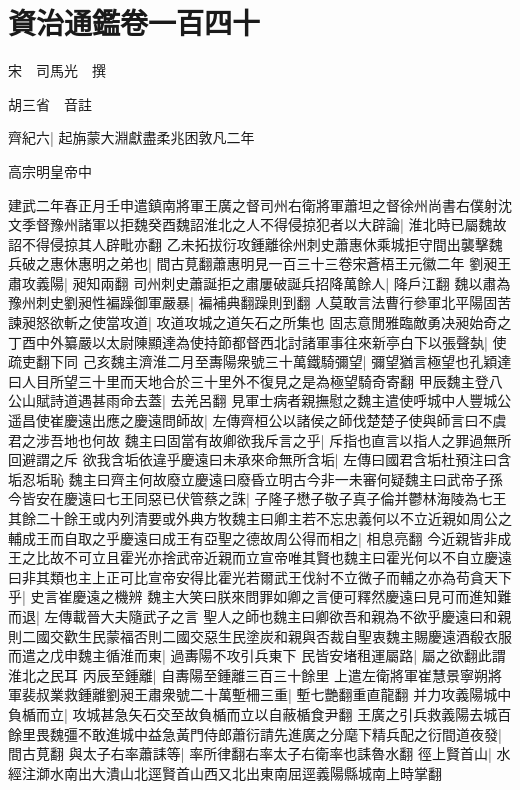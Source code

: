 \section{資治通鑑卷一百四十}
宋　司馬光　撰

胡三省　音註

齊紀六|{
	起旃蒙大淵獻盡柔兆困敦凡二年}


高宗明皇帝中

建武二年春正月壬申遣鎮南將軍王廣之督司州右衛將軍蕭坦之督徐州尚書右僕射沈文季督豫州諸軍以拒魏癸酉魏詔淮北之人不得侵掠犯者以大辟論|{
	淮北時已屬魏故詔不得侵掠其人辟毗亦翻}
乙未拓拔衍攻鍾離徐州刺史蕭惠休乘城拒守間出襲擊魏兵破之惠休惠明之弟也|{
	間古莧翻蕭惠明見一百三十三卷宋蒼梧王元徽二年}
劉昶王肅攻義陽|{
	昶知兩翻}
司州刺史蕭誕拒之肅屢破誕兵招降萬餘人|{
	降戶江翻}
魏以肅為豫州刺史劉昶性褊躁御軍嚴暴|{
	褊補典翻躁則到翻}
人莫敢言法曹行參軍北平陽固苦諫昶怒欲斬之使當攻道|{
	攻道攻城之道矢石之所集也}
固志意閒雅臨敵勇决昶始奇之丁酉中外纂嚴以太尉陳顯達為使持節都督西北討諸軍事往來新亭白下以張聲埶|{
	使疏吏翻下同}
己亥魏主濟淮二月至夀陽衆號三十萬鐵騎彌望|{
	彌望猶言極望也孔穎達曰人目所望三十里而天地合於三十里外不復見之是為極望騎奇寄翻}
甲辰魏主登八公山賦詩道遇甚雨命去蓋|{
	去羌呂翻}
見軍士病者親撫慰之魏主遣使呼城中人豐城公遥昌使崔慶遠出應之慶遠問師故|{
	左傳齊桓公以諸侯之師伐楚楚子使與師言曰不虞君之涉吾地也何故}
魏主曰固當有故卿欲我斥言之乎|{
	斥指也直言以指人之罪過無所回避謂之斥}
欲我含垢依違乎慶遠曰未承來命無所含垢|{
	左傳曰國君含垢杜預注曰含垢忍垢恥}
魏主曰齊主何故廢立慶遠曰廢昏立明古今非一未審何疑魏主曰武帝子孫今皆安在慶遠曰七王同惡已伏管蔡之誅|{
	子隆子懋子敬子真子倫并鬱林海陵為七王}
其餘二十餘王或内列清要或外典方牧魏主曰卿主若不忘忠義何以不立近親如周公之輔成王而自取之乎慶遠曰成王有亞聖之德故周公得而相之|{
	相息亮翻}
今近親皆非成王之比故不可立且霍光亦捨武帝近親而立宣帝唯其賢也魏主曰霍光何以不自立慶遠曰非其類也主上正可比宣帝安得比霍光若爾武王伐紂不立微子而輔之亦為苟貪天下乎|{
	史言崔慶遠之機辨}
魏主大笑曰朕來問罪如卿之言便可釋然慶遠曰見可而進知難而退|{
	左傳載晉大夫隨武子之言}
聖人之師也魏主曰卿欲吾和親為不欲乎慶遠曰和親則二國交歡生民蒙福否則二國交惡生民塗炭和親與否裁自聖衷魏主賜慶遠酒殽衣服而遣之戊申魏主循淮而東|{
	過夀陽不攻引兵東下}
民皆安堵租運屬路|{
	屬之欲翻此謂淮北之民耳}
丙辰至鍾離|{
	自夀陽至鍾離三百三十餘里}
上遣左衛將軍崔慧景寧朔將軍裴叔業救鍾離劉昶王肅衆號二十萬塹柵三重|{
	塹七艷翻重直龍翻}
并力攻義陽城中負楯而立|{
	攻城甚急矢石交至故負楯而立以自蔽楯食尹翻}
王廣之引兵救義陽去城百餘里畏魏彊不敢進城中益急黃門侍郎蕭衍請先進廣之分麾下精兵配之衍間道夜發|{
	間古莧翻}
與太子右率蕭誄等|{
	率所律翻右率太子右衛率也誄魯水翻}
徑上賢首山|{
	水經注溮水南出大潰山北逕賢首山西又北出東南屈逕義陽縣城南上時掌翻}
